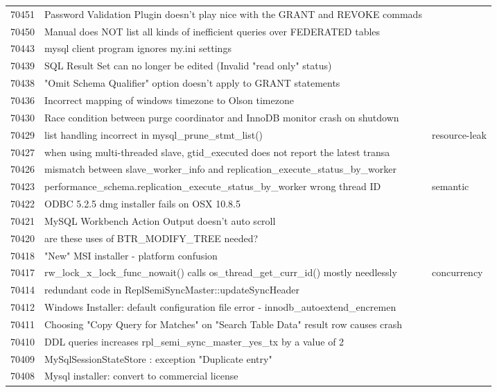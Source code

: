 \begin{longtable}[c]{p{1cm}p{10cm}p{1cm}}
70451 & Password Validation Plugin doesn't play nice with the GRANT and REVOKE commads &  \\
70450 & Manual does NOT list all kinds of inefficient queries over FEDERATED tables &  \\
70443 & mysql client program ignores my.ini settings &  \\
70439 & SQL Result Set can no longer be edited (Invalid "read only" status) &  \\
70438 & "Omit Schema Qualifier" option doesn't apply to GRANT statements &  \\
70436 & Incorrect mapping of windows timezone to Olson timezone &  \\
70430 & Race condition between purge coordinator and InnoDB monitor crash on shutdown &  \\
70429 & list handling incorrect in mysql\_prune\_stmt\_list() & resource-leak \\
70427 & when using multi-threaded slave, gtid\_executed does not report the latest transa &  \\
70426 & mismatch between slave\_worker\_info and replication\_execute\_status\_by\_worker &  \\
70423 & performance\_schema.replication\_execute\_status\_by\_worker wrong thread ID & semantic \\
70422 & ODBC 5.2.5 dmg installer fails on OSX 10.8.5 &  \\
70421 & MySQL Workbench Action Output doesn't auto scroll &  \\
70420 & are these uses of BTR\_MODIFY\_TREE needed? &  \\
70418 & "New" MSI installer - platform confusion &  \\
70417 & rw\_lock\_x\_lock\_func\_nowait() calls os\_thread\_get\_curr\_id() mostly needlessly & concurrency \\
70414 & redundant code in ReplSemiSyncMaster::updateSyncHeader &  \\
70412 & Windows Installer: default configuration file error - innodb\_autoextend\_encremen &  \\
70411 & Choosing "Copy Query for Matches" on "Search Table Data" result row causes crash &  \\
70410 & DDL queries increases rpl\_semi\_sync\_master\_yes\_tx by a value of 2 &  \\
70409 & MySqlSessionStateStore : exception "Duplicate entry" &  \\
70408 & Mysql installer: convert to commercial license &  \\

\end{longtable}
